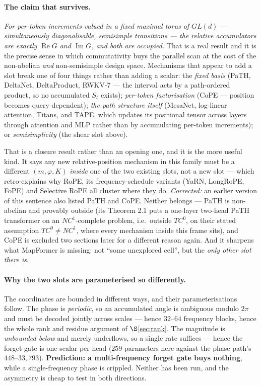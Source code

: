 \documentclass[11pt]{article}
\begin{document}
\paragraph{The claim that survives.} \emph{For per-token increments valued in a
fixed maximal torus of $GL(d)$ --- simultaneously diagonalisable, semisimple
transitions --- the relative accumulators are exactly $\operatorname{Re}G$ and
$\operatorname{Im}G$, and both are occupied.} That is a real result and it is the
precise sense in which commutativity buys the parallel scan at the cost of the
non-abelian \emph{and} non-semisimple design space. Mechanisms that appear to add
a slot break one of four things rather than adding a scalar: the \emph{fixed
basis} (PaTH, DeltaNet, DeltaProduct, RWKV-7 --- the interval acts by a
path-ordered product, so no accumulated $S_t$ exists); \emph{per-token
factorisation} (CoPE --- position becomes query-dependent); \emph{the path
structure itself} (MesaNet, log-linear attention, Titans, and TAPE, which updates
its positional tensor across layers through attention and MLP rather than by
accumulating per-token increments); or
\emph{semisimplicity} (the shear slot above).

That is a closure result rather than an opening one, and it is the more useful
kind. It says any new relative-position mechanism in this family must be a
different $(m,\varphi,K)$ \emph{inside} one of the two existing slots, not a new
slot --- which retro-explains why RoPE, its frequency-schedule variants (YaRN,
LongRoPE, FoPE) and Selective RoPE all cluster where they do. \emph{Corrected:} an
earlier version of this sentence also listed PaTH and CoPE. Neither belongs ---
PaTH is non-abelian and provably outside (its Theorem 2.1 puts a one-layer
two-head PaTH transformer on an $NC^1$-complete problem, i.e.\ outside $TC^0$, on their stated assumption $TC^0 \neq NC^1$,
where every mechanism inside this frame sits), and CoPE is excluded two sections
later for a different reason again. And it sharpens what MapFormer is
missing: not ``some unexplored cell'', but the \emph{only other slot there is}.

\paragraph{Why the two slots are parameterised so differently.} The coordinates
are bounded in different ways, and their parameterisations follow. The phase is
\emph{periodic}, so an accumulated angle is ambiguous modulo $2\pi$ and must be
decoded jointly across scales --- hence $32$--$64$ frequency blocks, hence the
whole rank and residue argument of $\S$\ref{sec:rank}. The magnitude is
\emph{unbounded below} and merely underflows, so a single rate suffices --- hence
the forget gate is one scalar per head ($259$ parameters here against the phase
path's $448$--$33{,}793$). \textbf{Prediction: a multi-frequency forget gate buys
nothing}, while a single-frequency phase is crippled. Neither has been run, and
the asymmetry is cheap to test in both directions.
\end{document}
